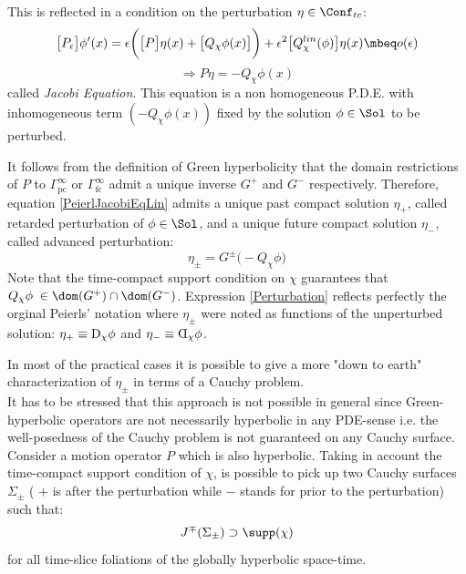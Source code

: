 \documentclass[Main]{subfiles}
\begin{document}
		This is reflected in a condition on the perturbation $\eta \in \Conf_{tc}$:
		\begin{displaymath}
			\big[P_\epsilon\big] \phi'(x) =  \epsilon \biggr( \big[P\big] \eta(x) + \big[Q_\chi \phi(x) \big]\biggr)+ \epsilon^2 \big[Q_\chi^{lin}(\phi)  \big]	\eta(x) \mbeq o(\epsilon)
		\end{displaymath}
		\begin{equation}\label{PeierlJacobiEqLin}
			\Rightarrow P \eta = - Q_\chi \phi(x)
		\end{equation}
		called \emph{Jacobi Equation}.
		This equation is a non homogeneous P.D.E. with inhomogeneous term $ (- Q_\chi \phi(x))$ fixed by the solution $\phi\in \Sol$ to be perturbed.

		It follows from the definition of Green hyperbolicity that the domain restrictions of $P$ to $\Gamma^\infty_{\textrm{pc}}$ or $\Gamma^\infty_{\textrm{fc}}$ admit a unique inverse $G^+$ and $G^-$ respectively.
   		Therefore, equation \ref{PeierlJacobiEqLin} admits a unique past compact solution $\eta_+$, called retarded perturbation of $\phi\in \Sol$, and a unique future compact solution $\eta_-$, called advanced perturbation:
   		\begin{equation}\label{Perturbation}
   			\eta_\pm = G^\pm \big( - Q_\chi \phi \big)
   		\end{equation}
   		Note that the time-compact support condition on $\chi$ guarantees that $Q_\chi \phi \; \in \dom(G^+) \cap \dom(G^-)$.
   		Expression \ref{Perturbation} reflects perfectly the orginal Peierls' notation where $\eta_\pm$ were noted as functions of the unperturbed solution: $\eta_+ \equiv\reflectbox{\reflectbox{D}}_\chi \phi$ and $\eta_- \equiv  \reflectbox{D}_\chi \phi$.
		
		\vspace{2mm}
			In most of the practical cases it is possible to give a more "down to earth" characterization of $\eta_\pm$ in terms of a Cauchy problem.\\
			It has to be stressed that this approach is not possible in general since Green-hyperbolic operators are not necessarily hyperbolic in any PDE-sense i.e. the well-posedness of the Cauchy problem is not guaranteed on any Cauchy surface. \cite[pag 1]{Bar} \cite[remark 3.18]{Bar2010}\cite[remark 2.1]{Khavkine2014}
			\\
		Consider a motion operator $P$ which is also hyperbolic.
		Taking in account the time-compact support condition of $\chi$, is possible to pick up  two Cauchy surfaces $\Sigma_\pm$ ( $+$ is after the perturbation while $-$ stands for prior to the perturbation) such that:
		\begin{displaymath}
			J^\mp (\Sigma_\pm) \supset \supp(\chi) 
		\end{displaymath}
		for all time-slice foliations of the globally hyperbolic space-time.
\end{document}
